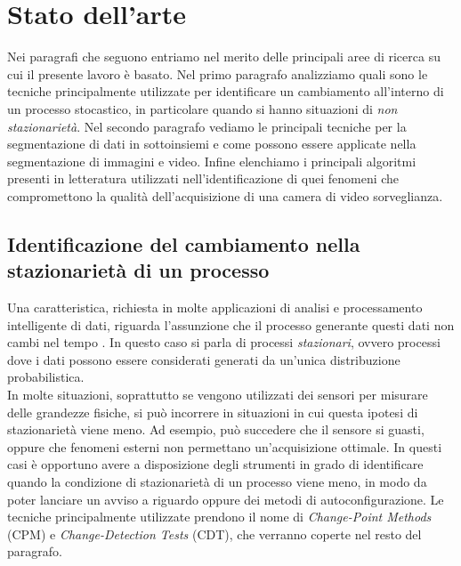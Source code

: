 \chapter{Stato dell'arte}
\label{capitolo2}
\thispagestyle{empty}

\vspace{0.5cm}


\noindent Nei paragrafi che seguono entriamo nel merito delle principali aree di ricerca su cui il presente lavoro \`e basato.
Nel primo paragrafo analizziamo quali sono le tecniche principalmente utilizzate per identificare un cambiamento all'interno di un processo stocastico, in particolare quando si hanno situazioni di \textit{non stazionariet\`a}. Nel secondo paragrafo vediamo le principali tecniche per la segmentazione di dati in sottoinsiemi e come possono essere applicate nella segmentazione di immagini e video.
Infine elenchiamo i principali algoritmi presenti in letteratura utilizzati nell'identificazione di quei fenomeni che compromettono la qualit\`a dell'acquisizione di una camera di video sorveglianza.
\section{Identificazione del cambiamento nella stazionariet\`a di un
  processo}
Una caratteristica, richiesta in molte applicazioni di analisi e processamento intelligente di dati, riguarda l'assunzione che il processo generante questi dati non cambi nel tempo \cite{alippi2014intelligence}. In questo caso si parla di processi \textit{stazionari}, ovvero processi dove i dati possono essere considerati generati da un'unica distribuzione probabilistica. \\
In molte situazioni, soprattutto se vengono utilizzati dei sensori per
misurare delle grandezze fisiche, si pu\`o incorrere in situazioni in
cui questa ipotesi di stazionariet\`a viene meno. Ad esempio, pu\`o
succedere che il sensore si guasti, oppure che fenomeni esterni non
permettano un'acquisizione ottimale. In questi casi \`e opportuno
avere a disposizione degli strumenti in grado di identificare quando
la condizione di stazionariet\`a di un processo viene meno, in modo da
poter lanciare un avviso a riguardo oppure dei metodi di
autoconfigurazione. Le tecniche principalmente utilizzate prendono il
nome di \textit{Change-Point Methods} (CPM) e \textit{Change-Detection
  Tests} (CDT), che verranno coperte nel resto del paragrafo.
